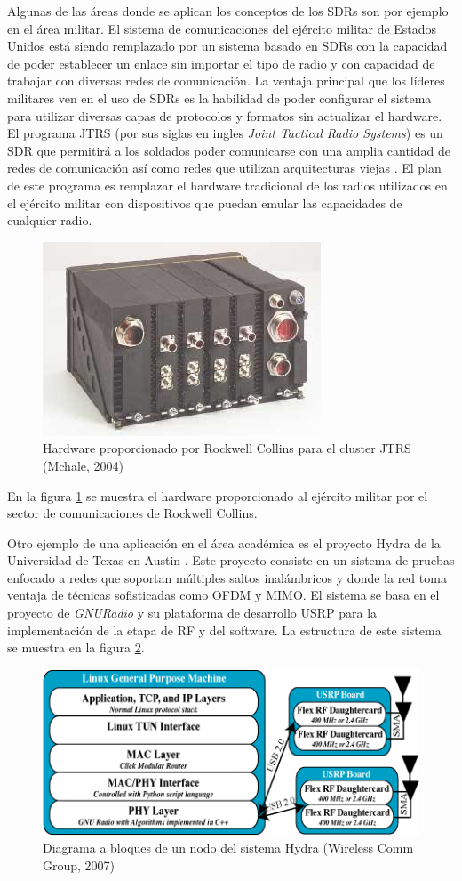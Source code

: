 Algunas de las \'areas donde se aplican los conceptos de los SDRs son por
ejemplo en el \'area militar. El sistema de comunicaciones del ej\'ercito
militar de Estados Unidos est\'a siendo remplazado por un sistema basado en SDRs
con la capacidad de poder establecer un enlace sin importar el tipo de radio y
con capacidad de trabajar con diversas redes de comunicaci\'on. La ventaja
principal que los l\'ideres militares ven en el uso de SDRs es la habilidad de
poder configurar el sistema para utilizar diversas capas de protocolos y
formatos sin actualizar el hardware. El programa JTRS (por sus siglas en ingles
\emph{Joint Tactical Radio Systems}) es un SDR que permitir\'a a los soldados
poder comunicarse con una amplia cantidad de redes de comunicaci\'on as\'i como
redes que utilizan arquitecturas viejas \cite{mchale}. El plan de
este programa es remplazar el hardware tradicional de los radios utilizados en
el ej\'ercito militar con dispositivos que puedan emular las capacidades de
cualquier radio.

\begin{figure}[pt]
\centering
	\includegraphics[scale=0.7]{figs/jtrs}
	\caption{Hardware proporcionado por Rockwell Collins para el cluster JTRS
	(Mchale, 2004)}
	\label{fig:jtrs}
\end{figure}

En la figura \ref{fig:jtrs} se muestra el hardware proporcionado al ej\'ercito
militar por el sector de comunicaciones de Rockwell Collins.

Otro ejemplo de una aplicaci\'on en el \'area acad\'emica es el proyecto Hydra
de la Universidad de Texas en Austin \cite{hydra}. Este proyecto consiste en un
sistema de pruebas enfocado a redes que soportan m\'ultiples saltos
inal\'ambricos y donde la red toma ventaja de t\'ecnicas sofisticadas como OFDM
y MIMO. El sistema se basa en el proyecto de \emph{GNURadio} y su plataforma de
desarrollo USRP \cite{ettus} para la implementaci\'on de la etapa de RF y del
software. La estructura de este sistema se muestra en la figura \ref{fig:hydra}.

\begin{figure}[hpt]
\centering
	\includegraphics[scale=0.7]{figs/hydra}
	\vspace{0.5in}
	\caption{Diagrama a bloques de un nodo del sistema Hydra (Wireless
	Comm Group, 2007)}
	\label{fig:hydra}
\end{figure}
